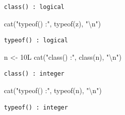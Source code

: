 \documentclass[
  french,
  11pt,
  a4paper,
]{article}
\newenvironment{Shaded}{}{}
\newcommand{\DecValTok}[1]{\textcolor[rgb]{0.00,0.36,0.77}{#1}}
\newcommand{\FunctionTok}[1]{\textcolor[rgb]{0.44,0.26,0.76}{#1}}
\newcommand{\NormalTok}[1]{\textcolor[rgb]{0.14,0.16,0.18}{#1}}
\newcommand{\OtherTok}[1]{\textcolor[rgb]{0.44,0.26,0.76}{#1}}
\newcommand{\SpecialCharTok}[1]{\textcolor[rgb]{0.00,0.36,0.77}{#1}}
\newcommand{\StringTok}[1]{\textcolor[rgb]{0.01,0.18,0.38}{#1}}
\begin{document}
\begin{verbatim}
class() : logical 
\end{verbatim}

\begin{Shaded}
\begin{Highlighting}[]
\FunctionTok{cat}\NormalTok{(}\StringTok{"typeof() :"}\NormalTok{, }\FunctionTok{typeof}\NormalTok{(z), }\StringTok{"}\SpecialCharTok{\textbackslash{}n}\StringTok{"}\NormalTok{)}
\end{Highlighting}
\end{Shaded}

\begin{verbatim}
typeof() : logical 
\end{verbatim}

\begin{Shaded}
\begin{Highlighting}[]
\NormalTok{n }\OtherTok{\textless{}{-}} \DecValTok{10}\NormalTok{L}
\FunctionTok{cat}\NormalTok{(}\StringTok{"class() :"}\NormalTok{, }\FunctionTok{class}\NormalTok{(n), }\StringTok{"}\SpecialCharTok{\textbackslash{}n}\StringTok{"}\NormalTok{)}
\end{Highlighting}
\end{Shaded}

\begin{verbatim}
class() : integer 
\end{verbatim}

\begin{Shaded}
\begin{Highlighting}[]
\FunctionTok{cat}\NormalTok{(}\StringTok{"typeof() :"}\NormalTok{, }\FunctionTok{typeof}\NormalTok{(n), }\StringTok{"}\SpecialCharTok{\textbackslash{}n}\StringTok{"}\NormalTok{)}
\end{Highlighting}
\end{Shaded}

\begin{verbatim}
typeof() : integer 
\end{verbatim}
\end{document}
